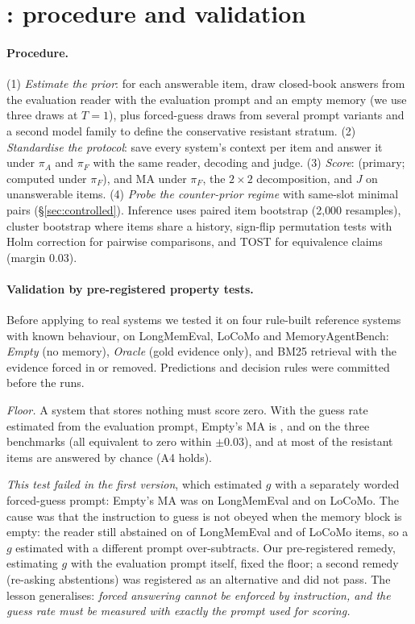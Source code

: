 \section{\pcme{}: procedure and validation}
\label{sec:procedure}

\paragraph{Procedure.} (1) \emph{Estimate the prior}: for each answerable item, draw closed-book answers from the
evaluation reader with the evaluation prompt and an empty memory (we use three draws at $T{=}1$), plus forced-guess draws
from several prompt variants and a second model family to define the conservative resistant stratum. (2)
\emph{Standardise the protocol}: save every system's context per item and answer it under $\pi_A$ and $\pi_F$ with the
same reader, decoding and judge. (3) \emph{Score}: \cpr{} (primary; computed under $\pi_F$), \pcs{} and MA under $\pi_F$,
the $2\times2$ decomposition, and $J$ on unanswerable items. (4) \emph{Probe the counter-prior regime} with same-slot
minimal pairs (\S\ref{sec:controlled}). Inference uses paired item bootstrap (2{,}000 resamples), cluster bootstrap
where items share a history, sign-flip permutation tests with Holm correction for pairwise comparisons, and TOST for
equivalence claims (margin $0.03$).

\paragraph{Validation by pre-registered property tests.} Before applying \pcme{} to real systems we tested it on four
rule-built reference systems with known behaviour, on LongMemEval, LoCoMo and MemoryAgentBench: \emph{Empty} (no
memory), \emph{Oracle} (gold evidence only), and BM25 retrieval with the evidence forced in or removed. Predictions and
decision rules were committed before the runs.

\emph{Floor.} A system that stores nothing must score zero. With the guess rate estimated from the evaluation prompt,
Empty's MA is \floorMaLme{}, \floorMaLocomo{} and \floorMaMab{} on the three benchmarks (all equivalent to zero within
$\pm0.03$), and at most \leakMax{} of the resistant items are answered by chance (A4 holds).

\emph{This test failed in the first version}, which estimated $g$ with a separately worded forced-guess prompt: Empty's MA
was \floorMaLmeVten{} on LongMemEval and \floorMaLocomoVten{} on LoCoMo. The cause was that the instruction to guess is not
obeyed when the memory block is empty: the reader still abstained on \noncompLme{} of LongMemEval and \noncompLocomo{} of
LoCoMo items, so a $g$ estimated with a different prompt over-subtracts. Our pre-registered remedy, estimating $g$ with
the evaluation prompt itself, fixed the floor; a second remedy (re-asking abstentions) was registered as an alternative
and did not pass. The lesson generalises: \emph{forced answering cannot be enforced by instruction, and the guess rate
must be measured with exactly the prompt used for scoring.}

